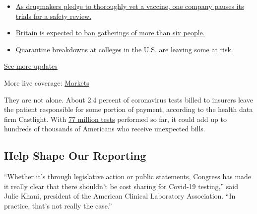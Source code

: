 \begin{itemize}
\tightlist
\item
  \href{https://www.nytimes3xbfgragh.onion/2020/09/09/world/covid-19-coronavirus.html?action=click\&pgtype=Article\&state=default\&region=MAIN_CONTENT_1\&context=storylines_live_updates\#link-70cea8bb}{As
  drugmakers pledge to thoroughly vet a vaccine, one company pauses its
  trials for a safety review.}
\item
  \href{https://www.nytimes3xbfgragh.onion/2020/09/09/world/covid-19-coronavirus.html?action=click\&pgtype=Article\&state=default\&region=MAIN_CONTENT_1\&context=storylines_live_updates\#link-780eaa2f}{Britain
  is expected to ban gatherings of more than six people.}
\item
  \href{https://www.nytimes3xbfgragh.onion/2020/09/09/world/covid-19-coronavirus.html?action=click\&pgtype=Article\&state=default\&region=MAIN_CONTENT_1\&context=storylines_live_updates\#link-11cec4c0}{Quarantine
  breakdowns at colleges in the U.S. are leaving some at risk.}
\end{itemize}

\href{https://www.nytimes3xbfgragh.onion/2020/09/09/world/covid-19-coronavirus.html?action=click\&pgtype=Article\&state=default\&region=MAIN_CONTENT_1\&context=storylines_live_updates}{See
more updates}

More live coverage:
\href{https://www.nytimes3xbfgragh.onion/live/2020/09/09/business/stock-market-today-coronavirus?action=click\&pgtype=Article\&state=default\&region=MAIN_CONTENT_1\&context=storylines_live_updates}{Markets}

They are not alone. About 2.4 percent of coronavirus tests billed to
insurers leave the patient responsible for some portion of payment,
according to the health data firm Castlight. With
\href{https://covidtracking.com/}{77 million tests} performed so far, it
could add up to hundreds of thousands of Americans who receive
unexpected bills.

\hypertarget{help-shape-our-reporting}{%
\subsection{Help Shape Our Reporting}\label{help-shape-our-reporting}}

``Whether it's through legislative action or public statements, Congress
has made it really clear that there shouldn't be cost sharing for
Covid-19 testing,'' said Julie Khani, president of the American Clinical
Laboratory Association. ``In practice, that's not really the case.''

